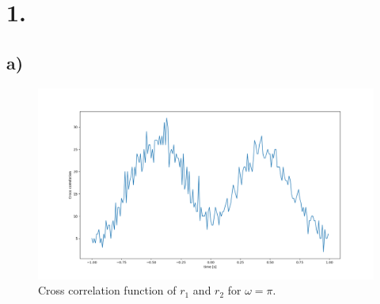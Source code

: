 \section*{1.}
\subsection*{a)}
\begin{figure}[H]
\centering
\includegraphics[scale=0.4]{1_a_pi.png}
\caption{Cross correlation function of $r_1$ and $r_2$ for $\omega = \pi$.}
\end{figure}

